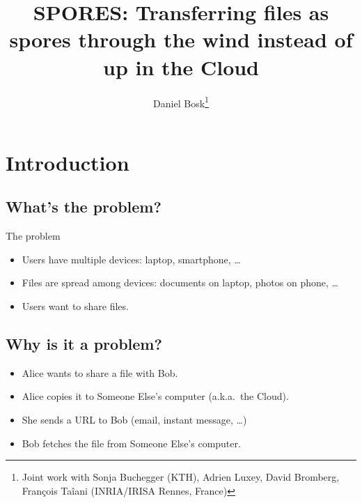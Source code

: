 \title{%
  SPORES: Transferring files as spores through the wind instead of up in the Cloud
}
\author{Daniel Bosk\thanks{%
    Joint work with Sonja Buchegger (KTH), Adrien Luxey, David Bromberg, 
    François Taîani (INRIA/IRISA Rennes, France)
  }}


\mode*


\section{Introduction}

\subsection{What's the problem?}

\begin{frame}
  \begin{block}{The problem}
    \begin{itemize}
      \item Users have multiple devices: laptop, smartphone, \dots
      \item Files are spread among devices: documents on laptop, photos on phone, 
        \dots

        \pause

      \item Users want to share files.
    \end{itemize}
  \end{block}
\end{frame}

\subsection{Why is it a problem?}

\begin{frame}
  \begin{example}
    \begin{itemize}
      \item Alice wants to share a file with Bob.
      \item Alice copies it to Someone Else's computer (a.k.a.\ the Cloud).
      \item She sends a URL to Bob (email, instant message, \dots)
      \item Bob fetches the file from Someone Else's computer.
    \end{itemize}
  \end{example}
\end{frame}


